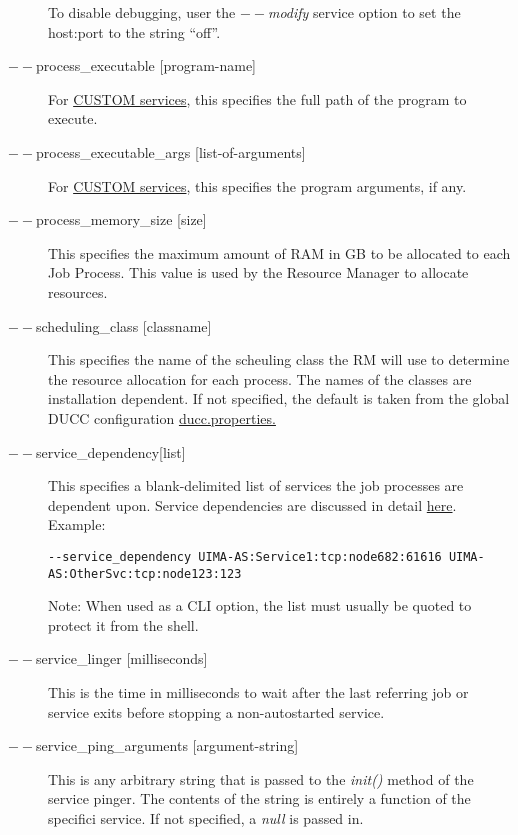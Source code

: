 \begin{description}
        To disable debugging, user the {\em $--$modify} service option to set the host:port to
        the string ``off''.

      \item[$--$process\_executable {[program-name]}] For \hyperref[sec:services.types]{CUSTOM
          services}, this specifies the full path of the program to execute.

      \item[$--$process\_executable\_args {[list-of-arguments]}] For \hyperref[sec:services.types]{CUSTOM
          services}, this specifies the program arguments, if any.

      \item[$--$process\_memory\_size {[size]}] This specifies the maximum amount of RAM in GB to be
        allocated to each Job Process.  This value is used by the Resource Manager to allocate
        resources. 

      \item[$--$scheduling\_class {[classname]}] This specifies the name of the scheuling class the RM
        will use to determine the resource allocation for each process. The names of the classes are
        installation dependent. If not specified, the default is taken from the global DUCC
        configuration \hyperref[sec:ducc.properties]{ducc.properties.}

      \item[$--$service\_dependency{[list]}] This specifies a blank-delimited list of services the job
        processes are dependent upon. Service dependencies are discussed in detail
        \hyperref[sec:service.endpoints]{here}. Example:
\begin{verbatim}
--service_dependency UIMA-AS:Service1:tcp:node682:61616 UIMA-AS:OtherSvc:tcp:node123:123 
\end{verbatim}

        Note: When used as a CLI option, the list must usually be
        quoted to protect it from the shell.
          

      \item[$--$service\_linger {[milliseconds]}] This is the time in milliseconds to wait after the last
        referring job or service exits before stopping a non-autostarted service.

      \item[$--$service\_ping\_arguments {[argument-string]}] This is any arbitrary string
        that is passed to the {\em init()} method of the service pinger.  The contents of
        the string is entirely a function of the specifici service.  If not specified,
        a {\em null} is passed in.


\end{description}
